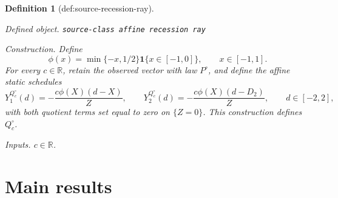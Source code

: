 \documentclass{article}
\newtheorem{definition}{Definition}
\begin{document}
\begin{definition}[def:source-recession-ray]\label{def:source-recession-ray}
\par\smallskip\noindent\emph{Defined object.} \texttt{source-\allowbreak{}class affine recession ray}
\par\smallskip\noindent\emph{Construction.} Define
\[
\phi(x)=\min\{-x,1/2\}\mathbf 1\{x\in[-1,0]\},
\qquad x\in[-1,1].
\]
For every \(c\in\mathbb R\), retain the observed vector with law \(P^{\circ}\), and define the affine static schedules
\[
Y_1^{Q_c^{\circ}}(d)=-\frac{c\phi(X)(d-X)}{Z},
\qquad
Y_2^{Q_c^{\circ}}(d)=-\frac{c\phi(X)(d-D_2)}{Z},
\qquad d\in[-2,2],
\]
with both quotient terms set equal to zero on \(\{Z=0\}\). This construction defines \(Q_c^{\circ}\).
\par\smallskip\noindent\emph{Inputs.} \(c\in\mathbb R\).
\end{definition}

\section{Main results}
\end{document}
